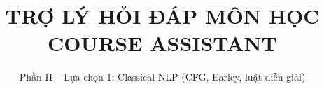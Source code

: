 \documentclass[oneside,final]{hcmut-report}
\title{TRỢ LÝ HỎI ĐÁP MÔN HỌC\\[2pt]\LARGE COURSE ASSISTANT}
\subtitle{Phần II -- Lựa chọn 1: Classical NLP (CFG, Earley, luật diễn giải)}
\begin{document}
\coverpage

\tableofcontents
\clearpage








\clearpage

\end{document}
